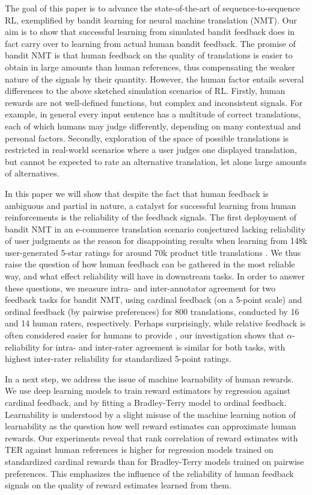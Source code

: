 The goal of this paper is to advance the state-of-the-art of sequence-to-sequence RL, exemplified by bandit learning for neural machine translation (NMT).  Our aim is to show that successful learning from simulated bandit feedback \cite{SokolovETALnips:16,KreutzerETAL:17,NguyenETAL:17,LawrenceETAL:17} does in fact carry over to learning from actual human bandit feedback. The promise of bandit NMT is that human feedback on the quality of translations is easier to obtain in large amounts than human references, thus compensating the weaker nature of the signals by their quantity. However, the human factor entails several differences to the above sketched simulation scenarios of RL. Firstly, human rewards are not well-defined functions, but complex and inconsistent signals. For example, in general every input sentence has a multitude of correct translations, each of which humans may judge differently, depending on many contextual and personal factors. Secondly, exploration of the space of possible  translations is restricted in real-world scenarios where a user judges one displayed translation, but cannot be expected to rate an alternative translation, let alone large amounts of alternatives.

In this paper we will show that despite the fact that human feedback is ambiguous and partial in nature, a catalyst for successful learning from human reinforcements is the reliability of the feedback signals. The first deployment of bandit NMT in an e-commerce translation scenario conjectured lacking reliability of user judgments as the reason for disappointing results when learning from 148k user-generated 5-star ratings for around 70k product title translations \cite{KreutzerETAL:18}. We thus raise the question of how human feedback can be gathered in the most reliable way, and what effect reliability will have in downstream tasks. In order to answer these questions, we measure intra- and inter-annotator agreement for two feedback tasks for bandit NMT, using cardinal feedback (on a 5-point scale) and ordinal feedback (by pairwise preferences) for 800 translations, conducted by 16 and 14 human raters, respectively. Perhaps surprisingly, while relative feedback is often considered easier for humans to provide \cite{Thurstone:27}, our investigation shows that $\alpha$-reliability \cite{Krippendorff:13} for intra- and inter-rater agreement is similar for both tasks, with highest inter-rater reliability for standardized 5-point ratings.

In a next step, we address the issue of machine learnability of human rewards. We use deep learning models to train reward estimators by regression against cardinal feedback, and by fitting a Bradley-Terry model \cite{BradleyTerry:52} to ordinal feedback. Learnability is understood by a slight misuse of the machine learning notion of learnability \cite{ShalevShwartzETAL:10} as the question how well reward estimates can approximate human rewards. Our experiments reveal that rank correlation of reward estimates with TER against human references is higher for regression models trained on standardized cardinal rewards than for Bradley-Terry models trained on pairwise preferences. This emphasizes the influence of the reliability of human feedback signals on the quality of reward estimates learned from them.

